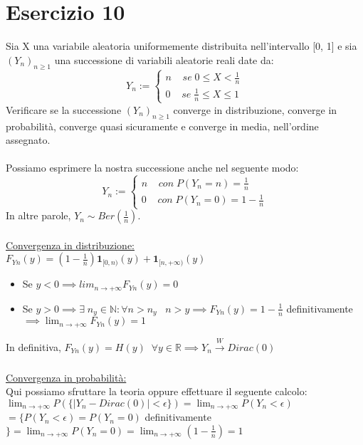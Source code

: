 \documentclass{article}
\begin{document}
\section*{Esercizio 10}
Sia X una variabile aleatoria uniformemente distribuita nell'intervallo [0, 1] e sia $(Y_{n})_{n\geq 1}$ una successione di variabili aleatorie reali date da:
\[ Y_{n} :=
\begin{cases}
n \; \; \; \; se \; 0 \leq X < \frac{1}{n}\\
0 \; \; \; \; se \; \frac{1}{n} \leq X \leq 1
\end{cases}
\]
Verificare se la successione $(Y_{n})_{n\geq 1}$ converge in distribuzione, converge in probabilità, converge quasi sicuramente e converge in media, nell'ordine assegnato.\\
\\
Possiamo esprimere la nostra successione anche nel seguente modo:
\[ Y_{n} :=
\begin{cases}
n \; \; \; \; con \; P(Y_{n}=n) = \frac{1}{n}\\
0 \; \; \; \; con \; P(Y_{n}=0) = 1 - \frac{1}{n}
\end{cases}
\]
In altre parole, $Y_{n} \sim Ber(\frac{1}{n})$.\\
\\
\underline{Convergenza in distribuzione:}\\
$F_{Yn}(y) = (1-\frac{1}{n}) \mathbf{1}_{[0,n)}(y) + \mathbf{1}_{[n,+\infty)}(y)$
\begin{itemize}
\item Se $y<0 \implies lim_{n\to +\infty}F_{Yn}(y) = 0$
\item Se $y>0 \implies \exists \; n_{y} \in \mathbb{N} : \forall n > n_{y} \; \; \; n>y \implies F_{Yn}(y) = 1-\frac{1}{n}$ definitivamente $\implies \lim_{n\to +\infty}F_{Yn}(y) = 1$
\end{itemize}
In definitiva, $F_{Yn}(y) = H(y) \; \; \forall y \in \mathbb{R} \implies Y_{n} \xrightarrow[]{W} Dirac(0)$\\
\\
\underline{Convergenza in probabilità:}\\
Qui possiamo sfruttare la teoria oppure effettuare il seguente calcolo:\\
$\lim_{n\to +\infty}P(\{ |Y_{n}-Dirac(0)| < \epsilon \}) = \lim_{n\to +\infty}P(Y_{n}<\epsilon)$\\
$ = \{ P(Y_{n}<\epsilon) = P(Y_{n} = 0)$ definitivamente$\} = \lim_{n\to +\infty}P(Y_{n}=0) = \lim_{n\to +\infty}(1-\frac{1}{n}) = 1$\\
\end{document}
